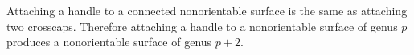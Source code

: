 Attaching a handle to a connected nonorientable surface is the same as attaching two crosscaps. Therefore attaching a handle to a nonorientable surface of genus $p$ produces a nonorientable surface of genus $p + 2$.

